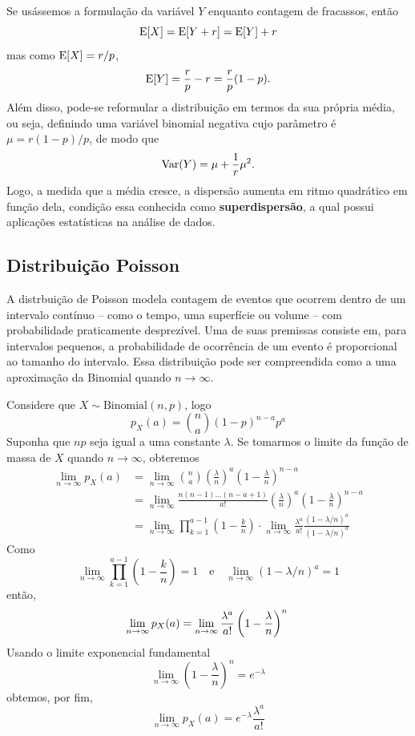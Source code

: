 \begin{obs:binomial negativa 2}
Se usássemos a formulação da variável $Y$ enquanto contagem de fracassos, então
\[
    \mathrm{E}\!\left[X\right] = \mathrm{E}\!\left[Y+r\right] = \mathrm{E}\!\left[Y\right] + r
\]
mas como $\mathrm{E}\!\left[X\right] = r/p$,
\[
    \mathrm{E}\!\left[Y\right] = \frac r p - r = \frac r p (1-p).
\]
Além disso, pode-se reformular a distribuição em termos da sua própria média, ou seja,
definindo uma variável binomial negativa cujo parâmetro é $\mu = r(1-p)/p$, de modo que
\[
    \mathrm{Var}\!\left(Y\right) = \mu + \frac 1 r \mu^2.
\]
Logo, a medida que a média cresce, a dispersão aumenta em ritmo quadrático em função dela,
condição essa conhecida como \textbf{superdispersão}, a qual possui aplicações estatísticas
na análise de dados.
\end{obs:binomial negativa 2}

\subsection{Distribuição Poisson}

A distrbuição de Poisson modela contagem de eventos que ocorrem dentro de um intervalo
contínuo -- como o tempo, uma superfície ou volume -- com probabilidade praticamente
desprezível.
Uma de suas premissas consiste em, para intervalos pequenos, a probabilidade de ocorrência
de um evento é proporcional ao tamanho do intervalo.
Essa distribuição pode ser compreendida como a uma aproximação da Binomial
quando $n \to \infty$.

Considere que $X \sim \mathrm{Binomial}(n, p)$, logo
\[
	p_X(a) = \binom{n}{a} (1-p)^{n-a} p^a
\]
Suponha que $np$ seja igual a uma constante $\lambda$.
Se tomarmos o limite da função de massa de $X$ quando $n \to \infty$, obteremos
\begin{align*}
	\lim_{n \to \infty} p_X(a) & = \lim_{n \to \infty} \binom{n}{a} \left(\frac{\lambda}{n}\right)^a \left(1 - \frac{\lambda}{n}\right)^{n-a}                  \\
	                           & = \lim_{n \to \infty} \frac{n(n-1)\ldots(n-a+1)}{a!}\left(\frac{\lambda}{n}\right)^a \left(1 - \frac{\lambda}{n}\right)^{n-a} \\
	                           & = \lim_{n \to \infty} \prod_{k=1}^{a-1} \left(1 - \frac{k}{n}\right) \cdot
	\lim_{n \to \infty} \frac{\lambda^a}{a!} \frac{(1 - \lambda / n)^n}{(1 - \lambda / n)^a}
\end{align*}
Como
\[
	\lim_{n \to \infty} \prod_{k=1}^{a-1} \left(1 - \frac{k}{n}\right) = 1 \quad
	\text{e} \quad \lim_{n \to \infty} (1 - \lambda / n)^a = 1
\]
então,
\[
	\lim_{n \to \infty} p_X(a) = \lim_{n \to \infty} \frac{\lambda^a}{a!} \left(1 - \frac{\lambda}{n}\right)^n \\
\]
Usando o limite exponencial fundamental
\[
	\lim_{n \to \infty} \left(1 - \frac{\lambda}{n}\right)^n = e^{-\lambda}
\]
obtemos, por fim,
\[
	\lim_{n \to \infty} p_X(a) = e^{-\lambda} \frac{\lambda^a}{a!}
\]

